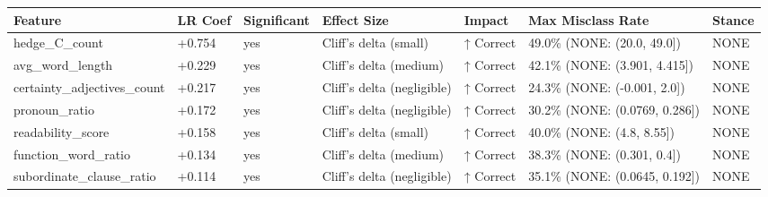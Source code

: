 \begin{tabular}{lllllll}
\toprule
Feature & LR Coef & Significant & Effect Size & Impact & Max Misclass Rate & Stance \\
\midrule
hedge\_C\_count & +0.754 & yes & Cliff's delta (small) & ↑ Correct & 49.0\% (NONE: (20.0, 49.0]) & NONE \\
avg\_word\_length & +0.229 & yes & Cliff's delta (medium) & ↑ Correct & 42.1\% (NONE: (3.901, 4.415]) & NONE \\
certainty\_adjectives\_count & +0.217 & yes & Cliff's delta (negligible) & ↑ Correct & 24.3\% (NONE: (-0.001, 2.0]) & NONE \\
pronoun\_ratio & +0.172 & yes & Cliff's delta (negligible) & ↑ Correct & 30.2\% (NONE: (0.0769, 0.286]) & NONE \\
readability\_score & +0.158 & yes & Cliff's delta (small) & ↑ Correct & 40.0\% (NONE: (4.8, 8.55]) & NONE \\
function\_word\_ratio & +0.134 & yes & Cliff's delta (medium) & ↑ Correct & 38.3\% (NONE: (0.301, 0.4]) & NONE \\
subordinate\_clause\_ratio & +0.114 & yes & Cliff's delta (negligible) & ↑ Correct & 35.1\% (NONE: (0.0645, 0.192]) & NONE \\
\bottomrule
\end{tabular}
